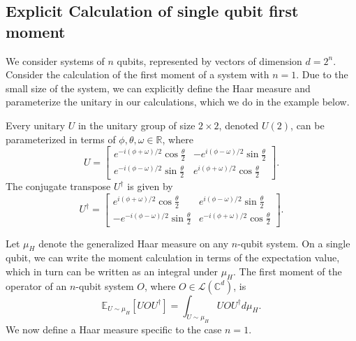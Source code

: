 \subsection{Explicit Calculation of single qubit first moment}
We consider systems of $n$ qubits, represented by vectors of dimension $d = 2^n$.
Consider the calculation of the first moment of a system with $n = 1$.
Due to the small size of the system, we can explicitly define the Haar measure and parameterize the unitary in our calculations, which we do in the example below.

\begin{remark}\label{rm:2x2UnitaryExplicitConstruction}
    Every unitary $U$ in the unitary group of size $2 \times 2$, denoted $U(2)$, can be parameterized in terms of $\phi, \theta, \omega \in \mathbb{R}$, where
    \begin{equation}
        U = \begin{bmatrix}
            e^{-i (\phi + \omega) / 2} \cos{\frac{\theta}{2}} & -e^{i (\phi - \omega) / 2} \sin{\frac{\theta}{2}}\\
            e^{-i (\phi - \omega) / 2} \sin{\frac{\theta}{2}} & e^{i (\phi + \omega) / 2} \cos{\frac{\theta}{2}}
        \end{bmatrix}.
    \end{equation}
    The conjugate transpose $U^{\dagger}$ is given by
    \begin{equation}
        U^{\dagger} = \begin{bmatrix}
        e^{i( \phi + \omega) / 2} \cos{\frac{\theta}{2}} & e^{i (\phi - \omega) / 2} \sin{\frac{\theta}{2}}\\
        - e^{-i (\phi - \omega) / 2} \sin{\frac{\theta}{2}} & e^{-i(\phi + \omega)/ 2} \cos{\frac{\theta}{2}}
        \end{bmatrix}.
    \end{equation}
\end{remark}

Let $\mu_{H}$ denote the generalized Haar measure on any $n$-qubit system.
On a single qubit, we can write the moment calculation in terms of the expectation value, which in turn can be written as an integral under $\mu_{H}$.
The first moment of the operator of an $n$-qubit system $O$, where $O \in \mathcal{L}(\mathbb{C}^{d})$, is
\begin{equation}
    \mathbb{E}_{U \sim \mu_{H}} [U O U^{\dagger}] = \int_{U \sim \mu_{H}} U O U^{\dagger} d\mu_{H}.
\end{equation}
We now define a Haar measure specific to the case $n = 1$.

